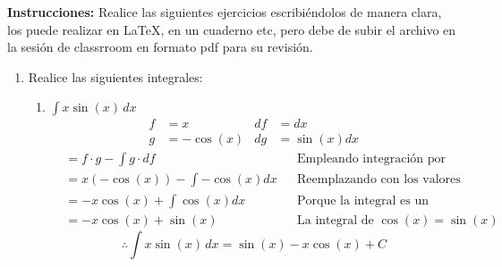 \documentclass[letterpaper]{article}
\renewcommand{\*}{\cdot}
\theoremstyle{definition}
\begin{document}
\noindent \textbf{Instrucciones:} Realice las siguientes ejercicios escribiéndolos  de manera clara, los puede realizar en \LaTeX, en un cuaderno etc, pero debe de subir el archivo en la sesión de classrroom en formato pdf para su revisión.


\begin{enumerate}



\section*{Métodos de integración}

\subsection*{Integración por partes (2.5 pts.)}
\item Realice las siguientes integrales:
\begin{enumerate}
	\item$\displaystyle \int x \sin(x) \, dx$
	\begin{align*}
		f &= x & df &= dx\\
		g &= -\cos(x) & dg &= \sin(x)dx
	\end{align*}
	\begin{align*}
		&= f \* g - \int g\*df &&\text{Empleando integración por partes}\\
		&= x(-\cos(x)) - \int -\cos(x)dx &&\text{Reemplazando con los valores elegidos}\\
		&= -x\cos(x) + \int \cos(x)dx &&\text{Porque la integral es un operador lineal}\\
		&= -x\cos(x) + \sin(x) &&\text{La integral de }\cos(x) = \sin(x)
	\end{align*}
	\[ \therefore \int x \sin(x) \, dx = \sin(x) - x\cos(x) + C  \]
	

\end{enumerate}
\end{enumerate}
\end{document}
